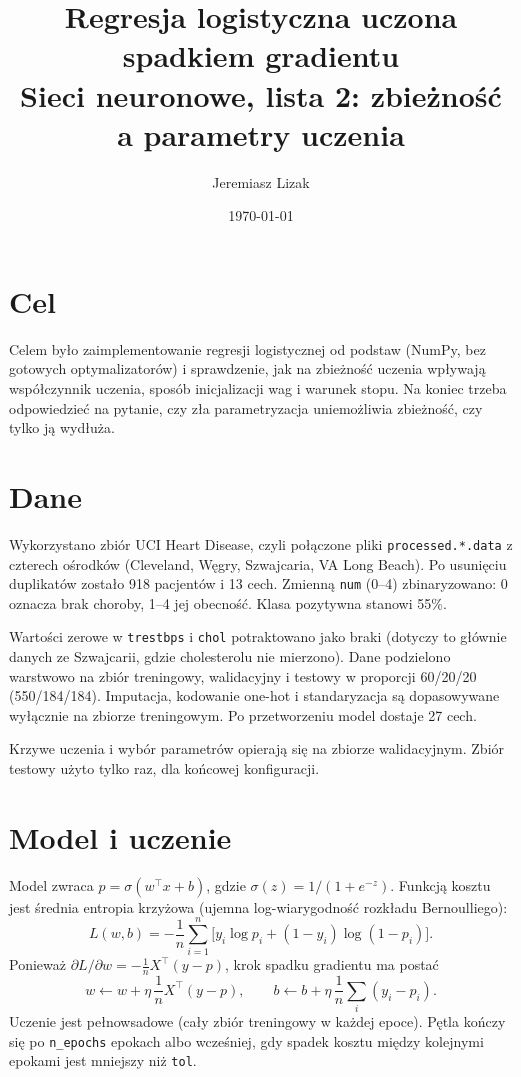 \documentclass[11pt,a4paper]{article}
\title{Regresja logistyczna uczona spadkiem gradientu\\
\large Sieci neuronowe, lista 2: zbieżność a parametry uczenia}
\author{Jeremiasz Lizak}
\date{\today}
\begin{document}
\maketitle

\section{Cel}

Celem było zaimplementowanie regresji logistycznej od podstaw (NumPy, bez gotowych
optymalizatorów) i sprawdzenie, jak na zbieżność uczenia wpływają współczynnik uczenia,
sposób inicjalizacji wag i warunek stopu. Na koniec trzeba odpowiedzieć na pytanie, czy zła
parametryzacja uniemożliwia zbieżność, czy tylko ją wydłuża.

\section{Dane}

Wykorzystano zbiór UCI Heart Disease, czyli połączone pliki \texttt{processed.*.data} z czterech
ośrodków (Cleveland, Węgry, Szwajcaria, VA Long Beach). Po usunięciu duplikatów zostało
918 pacjentów i 13 cech. Zmienną \texttt{num} (0--4) zbinaryzowano: 0 oznacza brak choroby,
1--4 jej obecność. Klasa pozytywna stanowi 55\%.

Wartości zerowe w \texttt{trestbps} i \texttt{chol} potraktowano jako braki (dotyczy to głównie
danych ze Szwajcarii, gdzie cholesterolu nie mierzono). Dane podzielono warstwowo na zbiór
treningowy, walidacyjny i testowy w proporcji 60/20/20 (550/184/184). Imputacja, kodowanie
one-hot i standaryzacja są dopasowywane wyłącznie na zbiorze treningowym. Po przetworzeniu
model dostaje 27 cech.

Krzywe uczenia i wybór parametrów opierają się na zbiorze walidacyjnym. Zbiór testowy użyto
tylko raz, dla końcowej konfiguracji.

\section{Model i uczenie}

Model zwraca $p = \sigma(w^\top x + b)$, gdzie $\sigma(z) = 1/(1+e^{-z})$. Funkcją kosztu jest
średnia entropia krzyżowa (ujemna log-wiarygodność rozkładu Bernoulliego):
\[
  L(w,b) = -\frac{1}{n}\sum_{i=1}^{n}\bigl[y_i \log p_i + (1-y_i)\log(1-p_i)\bigr].
\]
Ponieważ $\partial L/\partial w = -\frac{1}{n}X^\top(y-p)$, krok spadku gradientu ma postać
\[
  w \leftarrow w + \eta\,\frac{1}{n}X^\top(y-p), \qquad
  b \leftarrow b + \eta\,\frac{1}{n}\sum_i (y_i-p_i).
\]
Uczenie jest pełnowsadowe (cały zbiór treningowy w każdej epoce). Pętla kończy się po
\texttt{n\_epochs} epokach albo wcześniej, gdy spadek kosztu między kolejnymi epokami jest
mniejszy niż \texttt{tol}.
\end{document}

